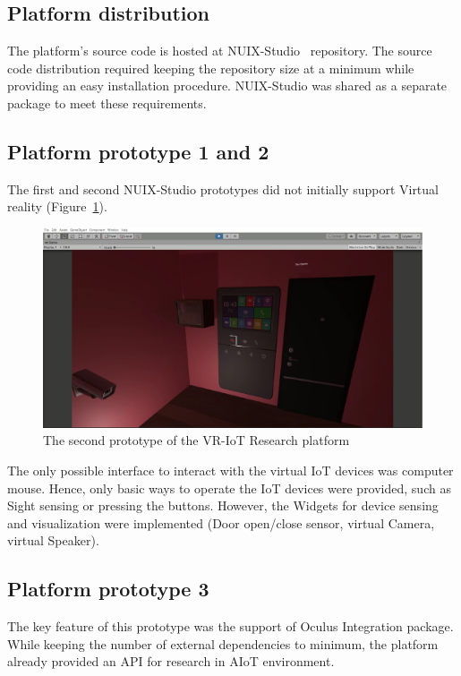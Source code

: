 \subsection{Platform distribution}

The platform's source code is hosted at NUIX-Studio~\cite{NUIXStudio} repository. The source code distribution required keeping the repository size at a minimum while providing an easy installation procedure. NUIX-Studio was shared as a separate package to meet these requirements.

\subsection{Platform prototype 1 and 2}

The first and second NUIX-Studio prototypes did not initially support Virtual reality (Figure~\ref{fig:Prototype2-figure}).

\begin{figure}
  \centering
  \includegraphics[width=0.9\linewidth]{figures/Prototype2.png}
  \caption{The second prototype of the VR-IoT Research platform}
  \label{fig:Prototype2-figure}
\end{figure}

The only possible interface to interact with the virtual IoT devices was computer mouse. Hence, only basic ways to operate the IoT devices were provided, such as Sight sensing or pressing the buttons. However, the Widgets for device sensing and visualization were implemented (Door open/close sensor, virtual Camera, virtual Speaker).

\subsection{Platform prototype 3}

The key feature of this prototype was the support of Oculus Integration package. While keeping the number of external dependencies to minimum, the platform already provided an API for research in AIoT environment.

